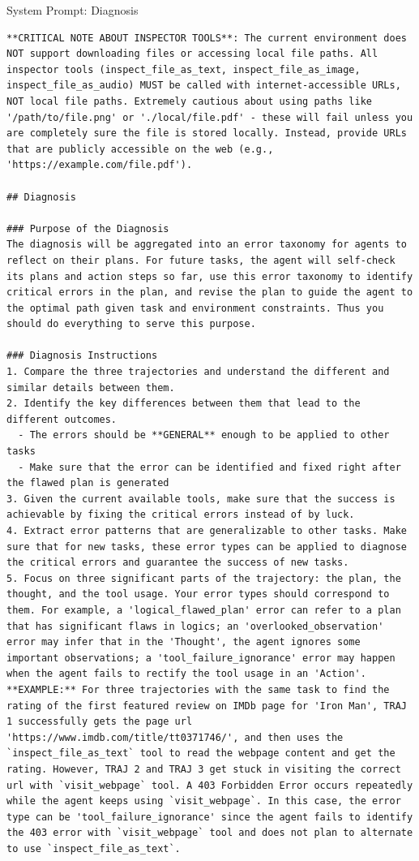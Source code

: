 \begin{SysPromptBox}{System Prompt: Diagnosis}
\begin{lstlisting}
**CRITICAL NOTE ABOUT INSPECTOR TOOLS**: The current environment does NOT support downloading files or accessing local file paths. All inspector tools (inspect_file_as_text, inspect_file_as_image, inspect_file_as_audio) MUST be called with internet-accessible URLs, NOT local file paths. Extremely cautious about using paths like '/path/to/file.png' or './local/file.pdf' - these will fail unless you are completely sure the file is stored locally. Instead, provide URLs that are publicly accessible on the web (e.g., 'https://example.com/file.pdf'). 

## Diagnosis

### Purpose of the Diagnosis
The diagnosis will be aggregated into an error taxonomy for agents to reflect on their plans. For future tasks, the agent will self-check its plans and action steps so far, use this error taxonomy to identify critical errors in the plan, and revise the plan to guide the agent to the optimal path given task and environment constraints. Thus you should do everything to serve this purpose.

### Diagnosis Instructions
1. Compare the three trajectories and understand the different and similar details between them.
2. Identify the key differences between them that lead to the different outcomes.
  - The errors should be **GENERAL** enough to be applied to other tasks
  - Make sure that the error can be identified and fixed right after the flawed plan is generated
3. Given the current available tools, make sure that the success is achievable by fixing the critical errors instead of by luck.
4. Extract error patterns that are generalizable to other tasks. Make sure that for new tasks, these error types can be applied to diagnose the critical errors and guarantee the success of new tasks.
5. Focus on three significant parts of the trajectory: the plan, the thought, and the tool usage. Your error types should correspond to them. For example, a 'logical_flawed_plan' error can refer to a plan that has significant flaws in logics; an 'overlooked_observation' error may infer that in the 'Thought', the agent ignores some important observations; a 'tool_failure_ignorance' error may happen when the agent fails to rectify the tool usage in an 'Action'.
**EXAMPLE:** For three trajectories with the same task to find the rating of the first featured review on IMDb page for 'Iron Man', TRAJ 1 successfully gets the page url 'https://www.imdb.com/title/tt0371746/', and then uses the `inspect_file_as_text` tool to read the webpage content and get the rating. However, TRAJ 2 and TRAJ 3 get stuck in visiting the correct url with `visit_webpage` tool. A 403 Forbidden Error occurs repeatedly while the agent keeps using `visit_webpage`. In this case, the error type can be 'tool_failure_ignorance' since the agent fails to identify the 403 error with `visit_webpage` tool and does not plan to alternate to use `inspect_file_as_text`.


\end{lstlisting}
\end{SysPromptBox}
